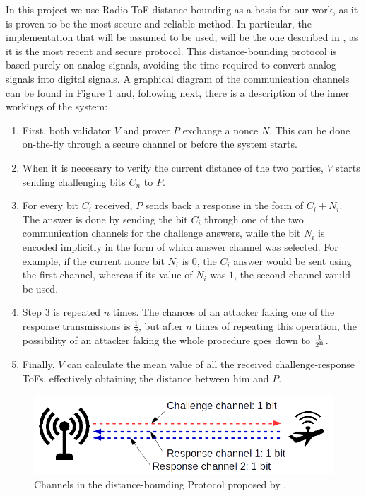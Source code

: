\documentclass{article}
\begin{document}
In this project we use Radio ToF distance-bounding as a basis for our work, as it is proven to be the most secure and reliable method. In particular, the implementation that will be assumed to be used, will be the one described in \cite{rasmussen2010realization}, as it is the most recent and secure protocol. This distance-bounding protocol is based purely on analog signals, avoiding the time required to convert analog signals into digital signals. A graphical diagram of the communication channels can be found in Figure \ref{fig:dbounding1} and, following next, there is a description of the inner workings of the system:\\



\begin{enumerate}
  \item First, both validator $V$ and prover $P$ exchange a nonce $N$. This can be done on-the-fly through a secure channel or before the system starts.
  \item When it is necessary to verify the current distance of the two parties, $V$ starts sending challenging bits $C_{n}$ to $P$.
  \item For every bit $C_{i}$ received, $P$ sends back a response in the form of $C_{i}+N_{i}$. The answer is done by sending the bit $C_{i}$ through one of the two communication channels for the challenge answers, while the bit $N_{i}$ is encoded implicitly in the form of which answer channel was selected. For example, if the current nonce bit $N_{i}$ is $0$, the $C_{i}$ answer would be sent using the first channel, whereas if its value of $N_{i}$ was $1$, the second channel would be used.
  \item Step 3 is repeated $n$ times. The chances of an attacker faking one of the response transmissions is $\frac{1}{2}$, but after $n$ times of repeating this operation, the possibility of an attacker faking the whole procedure goes down to $\frac{1}{2\textsuperscript{n}}$. 
  \item Finally, $V$ can calculate the mean value of all the received challenge-response ToFs, effectively obtaining the distance between him and $P$.
\end{enumerate}




\begin{figure}[h!]
  \centering
    \includegraphics[width=1\textwidth]{images/dbounding.png}
  \caption{Channels in the distance-bounding Protocol proposed by \citeauthor{rasmussen2010realization} \cite{rasmussen2010realization}.}
  \label{fig:dbounding1}
\end{figure}
\end{document}
